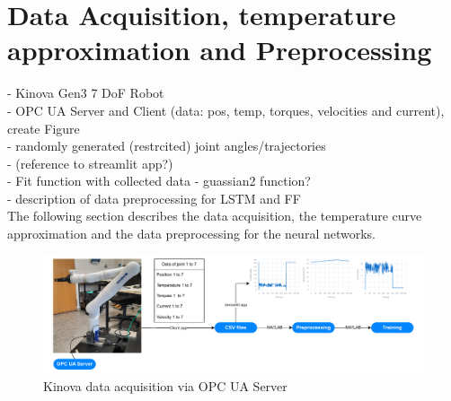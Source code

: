 \documentclass{ifacconf}
\begin{document}




\section{Data Acquisition, temperature approximation and Preprocessing}
- Kinova Gen3 7 DoF Robot \\
- OPC UA Server and Client (data: pos, temp, torques, velocities and current), create Figure\\
- randomly generated (restrcited) joint angles/trajectories \\
- (reference to streamlit app?)\\
- Fit function with collected data - guassian2 function? \\
- description of data preprocessing for LSTM and FF\\
The following section describes the data acquisition, the temperature curve approximation and the data preprocessing for the neural networks.

\begin{figure}
  \begin{center}
    \includegraphics[width=\textwidth]{pictures/DataAquisition.drawio.pdf} 
    \caption{Kinova data acquisition via OPC UA Server} 
    \label{fig:DataAquisition}
  \end{center}
\end{figure}
\end{document}
